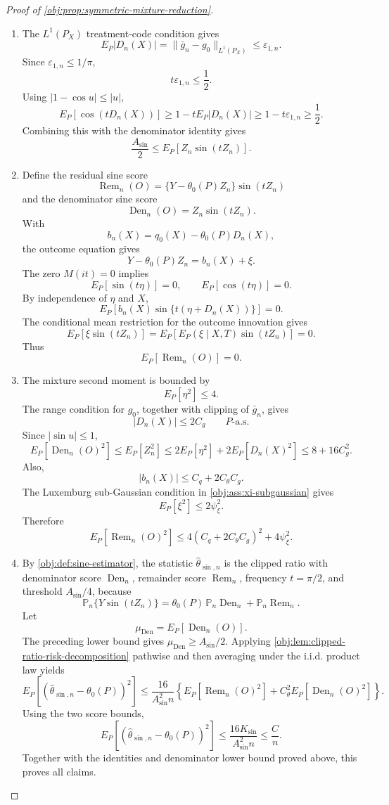 \begin{proof}[Proof of \cref{obj:prop:symmetric-mixture-reduction}]
\begin{enumerate}
\item The \(L^1(P_X)\) treatment-code condition gives
\[
E_P|D_n(X)|
=
\|\bar g_n-g_0\|_{L^1(P_X)}
\le \varepsilon_{1,n}.
\]
Since \(\varepsilon_{1,n}\le1/\pi\),
\[
t\varepsilon_{1,n}\le \frac12.
\]
Using \(|1-\cos u|\le |u|\),
\[
E_P[\cos(tD_n(X))]
\ge
1-tE_P|D_n(X)|
\ge
1-t\varepsilon_{1,n}
\ge \frac12.
\]
Combining this with the denominator identity gives
\[
\frac{A_{\sin}}{2}
\le
E_P\!\left[Z_n\sin(tZ_n)\right].
\]

\item Define the residual sine score
\[
\operatorname{Rem}_n(O)
=
\{Y-\theta_0(P)Z_n\}\sin(tZ_n)
\]
and the denominator sine score
\[
\operatorname{Den}_n(O)
=
Z_n\sin(tZ_n).
\]
With
\[
b_n(X)=q_0(X)-\theta_0(P)D_n(X),
\]
the outcome equation gives
\[
Y-\theta_0(P)Z_n=b_n(X)+\xi.
\]
The zero \(M(it)=0\) implies
\[
E_P[\sin(t\eta)]=0,\qquad E_P[\cos(t\eta)]=0.
\]
By independence of \(\eta\) and \(X\),
\[
E_P[b_n(X)\sin\{t(\eta+D_n(X))\}]=0.
\]
The conditional mean restriction for the outcome innovation gives
\[
E_P[\xi\sin(tZ_n)]
=
E_P\!\left[E_P(\xi\mid X,T)\sin(tZ_n)\right]
=0.
\]
Thus
\[
E_P[\operatorname{Rem}_n(O)]=0.
\]

\item The mixture second moment is bounded by
\[
E_P[\eta^2]\le4.
\]
The range condition for \(g_0\), together with clipping of \(\bar g_n\), gives
\[
|D_n(X)|\le2C_g\qquad P\text{-a.s.}
\]
Since \(|\sin u|\le1\),
\[
E_P[\operatorname{Den}_n(O)^2]
\le
E_P[Z_n^2]
\le
2E_P[\eta^2]+2E_P[D_n(X)^2]
\le
8+16C_g^2.
\]
Also,
\[
|b_n(X)|\le C_q+2C_{\theta}C_g.
\]
The Luxemburg sub-Gaussian condition in \cref{obj:ass:xi-subgaussian} gives
\[
E_P[\xi^2]\le2\psi_{\xi}^2.
\]
Therefore
\[
E_P[\operatorname{Rem}_n(O)^2]
\le
4(C_q+2C_{\theta}C_g)^2+4\psi_{\xi}^2.
\]

\item By \cref{obj:def:sine-estimator}, the statistic \(\widehat\theta_{\sin,n}\) is the
clipped ratio with denominator score \(\operatorname{Den}_n\), remainder score
\(\operatorname{Rem}_n\), frequency \(t=\pi/2\), and threshold \(A_{\sin}/4\), because
\[
\mathbb P_n\{Y\sin(tZ_n)\}
=
\theta_0(P)\,\mathbb P_n\operatorname{Den}_n
+\mathbb P_n\operatorname{Rem}_n.
\]
Let
\[
\mu_{\operatorname{Den}}=E_P[\operatorname{Den}_n(O)].
\]
The preceding lower bound gives \(\mu_{\operatorname{Den}}\ge A_{\sin}/2\). Applying
\cref{obj:lem:clipped-ratio-risk-decomposition} pathwise and then averaging under the
i.i.d. product law yields
\[
E_P\!\left[
(\widehat\theta_{\sin,n}-\theta_0(P))^2
\right]
\le
\frac{16}{A_{\sin}^2 n}
\left\{
E_P[\operatorname{Rem}_n(O)^2]
+
C_{\theta}^2E_P[\operatorname{Den}_n(O)^2]
\right\}.
\]
Using the two score bounds,
\[
E_P\!\left[
(\widehat\theta_{\sin,n}-\theta_0(P))^2
\right]
\le
\frac{16K_{\sin}}{A_{\sin}^2 n}
\le
\frac{C}{n}.
\]
Together with the identities and denominator lower bound proved above, this proves all claims. %
\end{enumerate}
\end{proof}


